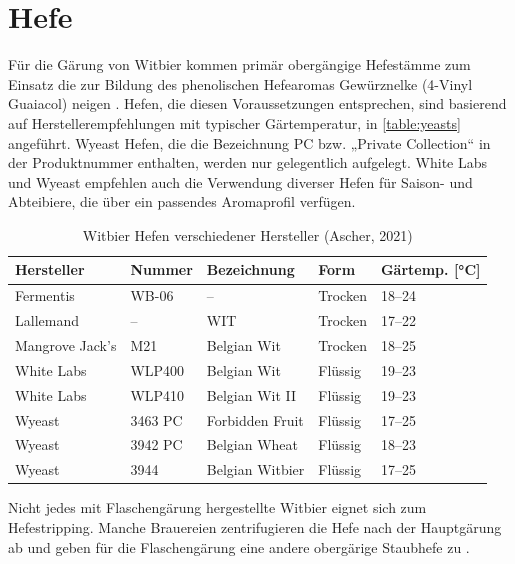 \documentclass[a4paper,parskip=half]{scrartcl}
\begin{document}
\section*{Hefe}

Für die Gärung von Witbier kommen primär obergängige Hefestämme
zum Einsatz die zur Bildung des phenolischen Hefearomas
Gewürznelke (4-Vinyl Guaiacol) neigen \parencite[46]{Roncoroni2018}.
Hefen, die diesen Voraussetzungen entsprechen, sind
basierend auf Herstellerempfehlungen mit typischer Gärtemperatur,
in \autoref{table:yeasts} angeführt. Wyeast Hefen, die die
Bezeichnung PC bzw. „Private Collection“ in der Produktnummer enthalten,
werden nur gelegentlich aufgelegt. White Labs und Wyeast empfehlen
auch die Verwendung diverser Hefen für Saison- und Abteibiere,
die über ein passendes Aromaprofil verfügen.

\begin{table}[H]
\centering
\begin{tabular}{lllll}
\toprule
Hersteller      & Nummer  & Bezeichnung          & Form    & Gärtemp. [°C] \\
\midrule
Fermentis       & WB-06   & –                    & Trocken & 18–24        \\
Lallemand       & –       & WIT                  & Trocken & 17–22        \\
Mangrove Jack's & M21     & Belgian Wit          & Trocken & 18–25        \\
White Labs      & WLP400  & Belgian Wit          & Flüssig & 19–23        \\
White Labs      & WLP410  & Belgian Wit II       & Flüssig & 19–23        \\
Wyeast          & 3463 PC & Forbidden Fruit      & Flüssig & 17–25        \\
Wyeast          & 3942 PC & Belgian Wheat        & Flüssig & 18–23        \\
Wyeast          & 3944    & Belgian Witbier      & Flüssig & 17–25        \\
\bottomrule
\end{tabular}
\caption{Witbier Hefen verschiedener Hersteller (Ascher, 2021)}
\label{table:yeasts}
\end{table}

Nicht jedes mit Flaschengärung hergestellte Witbier eignet sich zum
Hefestripping. Manche Brauereien zentrifugieren die Hefe nach
der Hauptgärung ab und geben für die Flaschengärung eine
andere obergärige Staubhefe zu \parencite[43]{Strottner1999}.
\end{document}
